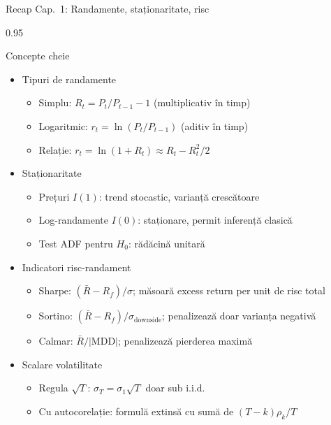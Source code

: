 \documentclass[9pt, aspectratio=169, t]{beamer}
\begin{document}
\begin{frame}[shrink=25]{Recap Cap.~1: Randamente, staționaritate, risc}
\begin{cminipage}{0.95\textwidth}
\begin{block}{Concepte cheie}
\begin{itemize}\setlength{\itemsep}{0pt}
    \item Tipuri de randamente
    \begin{itemize}\setlength{\itemsep}{0pt}
        \item Simplu: $R_t = P_t/P_{t-1} - 1$ (multiplicativ în timp)
        \item Logaritmic: $r_t = \ln(P_t/P_{t-1})$ (aditiv în timp)
        \item Relație: $r_t = \ln(1 + R_t) \approx R_t - R_t^2/2$
    \end{itemize}
    \item Staționaritate
    \begin{itemize}\setlength{\itemsep}{0pt}
        \item Prețuri $I(1)$: trend stocastic, varianță crescătoare
        \item Log-randamente $I(0)$: staționare, permit inferență clasică
        \item Test ADF pentru $H_0$: rădăcină unitară
    \end{itemize}
    \item Indicatori risc-randament
    \begin{itemize}\setlength{\itemsep}{0pt}
        \item Sharpe: $(\bar R - R_f)/\sigma$; măsoară excess return per unit de risc total
        \item Sortino: $(\bar R - R_f)/\sigma_{\text{downside}}$; penalizează doar varianța negativă
        \item Calmar: $\bar R / |\text{MDD}|$; penalizează pierderea maximă
    \end{itemize}
    \item Scalare volatilitate
    \begin{itemize}\setlength{\itemsep}{0pt}
        \item Regula $\sqrt{T}$: $\sigma_T = \sigma_1 \sqrt{T}$ doar sub i.i.d.
        \item Cu autocorelație: formulă extinsă cu sumă de $(T-k)\rho_k/T$
    \end{itemize}
\end{itemize}
\end{block}
\end{cminipage}
\end{frame}
\end{document}
